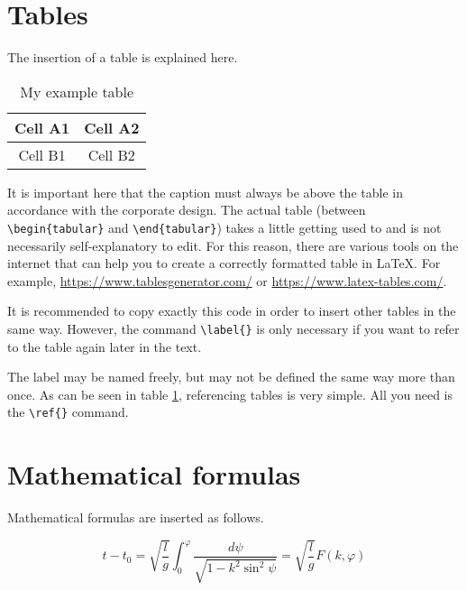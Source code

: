 \section{Tables}

The insertion of a table is explained here.

\begin{table}[H]
    \centering
    \caption{My example table}
    \label{tab:example}
    \begin{tabular}{|c|c|}
        \hline
        Cell A1 & Cell A2 \\
        \hline
        Cell B1 & Cell B2 \\
        \hline
    \end{tabular}
\end{table}

It is important here that the caption must always be above the table in accordance with the corporate design. The actual table (between \texttt{\textbackslash{}begin\{tabular\}} and \texttt{\textbackslash{}end\{tabular\}}) takes a little getting used to and is not necessarily self-explanatory to edit. For this reason, there are various tools on the internet that can help you to create a correctly formatted table in LaTeX. For example, \href{https://www.tablesgenerator.com/}{https://www.tablesgenerator.com/} or \href{https://www.latex-tables.com/}{https://www.latex-tables.com/}.

It is recommended to copy exactly this code in order to insert other tables in the same way. However, the command \texttt{\textbackslash{}label\{\}} is only necessary if you want to refer to the table again later in the text.

The label may be named freely, but may not be defined the same way more than once. As can be seen in table \ref{tab:example}, referencing tables is very simple. All you need is the \texttt{\textbackslash{}ref\{\}} command.


\section{Mathematical formulas}
Mathematical formulas are inserted as follows.

\begin{equation}
t-t_{0}=\sqrt{\frac{l}{g}}\int_{0}^{\varphi}{\frac{d\psi}{\sqrt{1-k^{2}\sin^{2} {\psi}}}} = \sqrt{\frac{l}{g}} F(k,\varphi)
\label{eq:example}
\end{equation}

